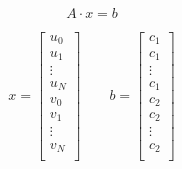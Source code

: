 \begin{equation}
A \cdot x = b
\label{eq:equationFormat}
\end{equation}

\begin{equation}
x = 
\left[
\begin{array}{c}
u_0 \\
u_1 \\
\vdots \\
u_N \\
v_0 \\
v_1 \\
\vdots \\
v_N \\
\end{array}
\right]
\qquad
b =
\left[
\begin{array}{c}
c_1 \\
c_1 \\
\vdots \\
c_1 \\
c_2 \\
c_2 \\
\vdots\\
c_2 \\
\end{array}
\right]
\label{eq:x-b_matrix}
\end{equation}


